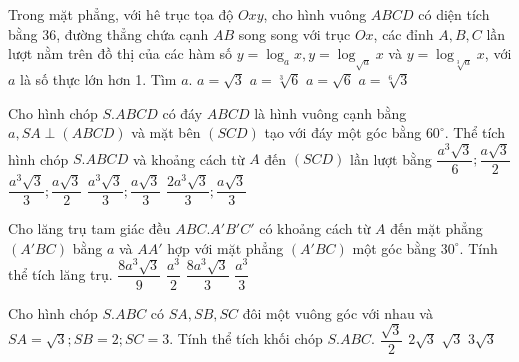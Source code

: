 \begin{ex}%
Trong mặt phẳng, với hê trục tọa độ $Oxy$, cho hình vuông $ABCD$ có diện tích bằng 36, đường thẳng chứa cạnh $AB$ song song với trục $Ox$, các đỉnh $A,B,C$ lần lượt nằm trên đồ thị của các hàm số $y=\log_a x, y=\log_{\sqrt{a}} x$ và $y=\log_{\sqrt[3]{a}} x$, với $a$ là số thực lớn hơn 1. Tìm $a$.
\choice
{$a=\sqrt{3}$}
{$a=\sqrt[3]{6}$}
{$a=\sqrt{6}$}
{\True $a=\sqrt[6]{3}$}
\end{ex}

\begin{ex}%
Cho hình chóp $S.ABCD$ có đáy $ABCD$ là hình vuông cạnh bằng $a, SA \perp (ABCD)$ và mặt bên $(SCD)$ tạo với đáy một góc bằng $60^\circ$. Thể tích hình chóp $S.ABCD$ và khoảng cách từ $A$ đến $(SCD)$ lần lượt bằng
\choice
{$\dfrac{a^3\sqrt{3}}{6}; \dfrac{a\sqrt{3}}{2}$}
{\True $\dfrac{a^3\sqrt{3}}{3}; \dfrac{a\sqrt{3}}{2}$}
{$\dfrac{a^3\sqrt{3}}{3}; \dfrac{a\sqrt{3}}{3}$}
{$\dfrac{2a^3\sqrt{3}}{3}; \dfrac{a\sqrt{3}}{3}$}
\end{ex}

\begin{ex}%
Cho lăng trụ tam giác đều $ABC.A'B'C'$ có khoảng cách từ $A$ đến mặt phẳng $(A'BC)$ bằng $a$ và $AA'$ hợp với mặt phẳng $(A'BC)$ một góc bằng $30^\circ$. Tính thể tích lăng trụ.
\choice
{\True $\dfrac{8a^3\sqrt{3}}{9}$}
{$\dfrac{a^3}{2}$}
{$\dfrac{8a^3\sqrt{3}}{3}$}
{$\dfrac{a^3}{3}$}
\end{ex}

\begin{ex}%
Cho hình chóp $S.ABC$ có $SA, SB, SC$ đôi một vuông góc với nhau và $SA=\sqrt{3}; SB=2; SC=3$. Tính thể tích khối chóp $S.ABC$.
\choice
{$\dfrac{\sqrt{3}}{2}$}
{$2\sqrt{3}$}
{\True $\sqrt{3}$}
{$3\sqrt{3}$}
\end{ex}

